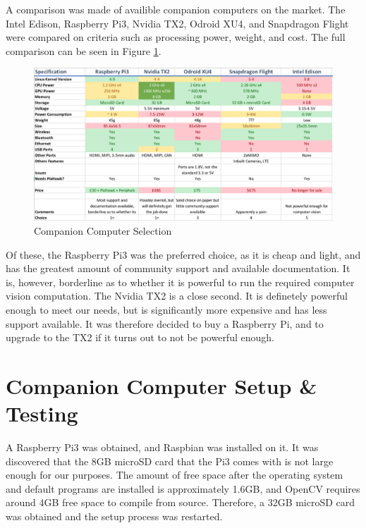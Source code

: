 \documentclass[11pt]{article}
\begin{document}
A comparison was made of availible companion computers on the market. The Intel Edison, Raspberry Pi3, Nvidia TX2, Odroid XU4, and Snapdragon Flight were compared on criteria such as processing power, weight, and cost. The full comparison can be seen in Figure \ref{fig:cc_selection}.

\begin{figure}[h]
    \includegraphics[width=\linewidth]{companion_computer_comparison}
    \caption{Companion Computer Selection} \label{fig:cc_selection}
\end{figure}

Of these, the Raspberry Pi3 was the preferred choice, as it is cheap and light, and has the greatest amount of community support and available documentation. It is, however, borderline as to whether it is powerful to run the required computer vision computation. The Nvidia TX2 is a close second. It is definetely powerful enough to meet our needs, but is significantly more expensive and has less support available. It was therefore decided to buy a Raspberry Pi, and to upgrade to the TX2 if it turns out to not be powerful enough.


\section{Companion Computer Setup \& Testing}
A Raspberry Pi3 was obtained, and Raspbian was installed on it. It was discovered that the 8GB microSD card that the Pi3 comes with is not large enough for our purposes. The amount of free space after the operating system and default programs are installed is approximately 1.6GB, and OpenCV requires around 4GB free space to compile from source. Therefore, a 32GB microSD card was obtained and the setup process was restarted.


\newpage
\appendix
\end{document}
